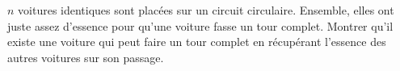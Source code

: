 $n$ voitures identiques sont placées sur un circuit circulaire. Ensemble, elles ont juste assez d'essence pour qu'une voiture fasse un tour complet. Montrer qu'il existe une voiture qui peut faire un tour complet en récupérant l'essence des autres voitures sur son passage.
